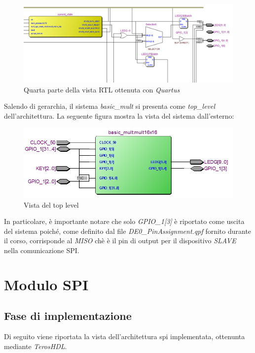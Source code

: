 \documentclass[titlepage]{report}
\begin{document}
			\begin{figure}[H]
				\centering
				\includegraphics[scale=0.4]{./img/quartus_rtl_viewer_4.png}
				\caption{Quarta parte della vista RTL ottenuta con \textit{Quartus}}
				\label{fig:rtl_quartus_4}
			\end{figure}		

			Salendo di gerarchia, il sistema \textit{basic\_mult} si presenta come \textit{top\_level} dell'architettura.
			La seguente figura mostra la vista del sistema dall'esterno:

			\begin{figure}[H]
				\centering
				\includegraphics[scale=0.4]{./img/top_basic_mult.jpg}
				\caption{Vista del top level}
				\label{fig:top_level_basic_mult}
			\end{figure}
			
			In particolare, è importante notare che solo \textit{GPIO\_1[3]} è riportato come uscita del sistema poiché, come definito dal file \textit{DE0\_PinAssignment.qpf} fornito durante il corso, corrisponde al \textit{MISO} chè è il pin di output per il dispositivo \textit{SLAVE} nella comunicazione SPI.

	\section*{Modulo SPI}
	\label{subsec:modulo_spi}
		\subsection*{Fase di implementazione}
		\label{subsec:spi_implementazione}
			Di seguito viene riportata la vista dell'architettura spi implementata, ottenunta mediante \textit{TerosHDL}.
			
\end{document}
